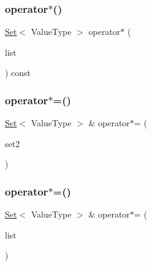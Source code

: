 \mbox{\label{classSet_ad904c8a1b9df49aa6c314d20f8f58514}} 
\subsubsection{\texorpdfstring{operator$\ast$()}{operator*()}\hspace{0.1cm}{\footnotesize\ttfamily [2/2]}}
{\footnotesize\ttfamily \mbox{\hyperlink{classSet}{Set}}$<$ Value\+Type $>$ operator$\ast$ (\begin{DoxyParamCaption}\item[{std\+::initializer\+\_\+list$<$ Value\+Type $>$}]{list }\end{DoxyParamCaption}) const}

\mbox{\label{classSet_a6bb863fdd7ae3e4cab2a9b1af7f9bfdb}} 
\subsubsection{\texorpdfstring{operator$\ast$=()}{operator*=()}\hspace{0.1cm}{\footnotesize\ttfamily [1/2]}}
{\footnotesize\ttfamily \mbox{\hyperlink{classSet}{Set}}$<$ Value\+Type $>$ \& operator$\ast$= (\begin{DoxyParamCaption}\item[{const \mbox{\hyperlink{classSet}{Set}}$<$ Value\+Type $>$ \&}]{set2 }\end{DoxyParamCaption})}

\mbox{\label{classSet_a00b5068e2a5ac025f0b007b152923e86}} 
\subsubsection{\texorpdfstring{operator$\ast$=()}{operator*=()}\hspace{0.1cm}{\footnotesize\ttfamily [2/2]}}
{\footnotesize\ttfamily \mbox{\hyperlink{classSet}{Set}}$<$ Value\+Type $>$ \& operator$\ast$= (\begin{DoxyParamCaption}\item[{std\+::initializer\+\_\+list$<$ Value\+Type $>$}]{list }\end{DoxyParamCaption})}

